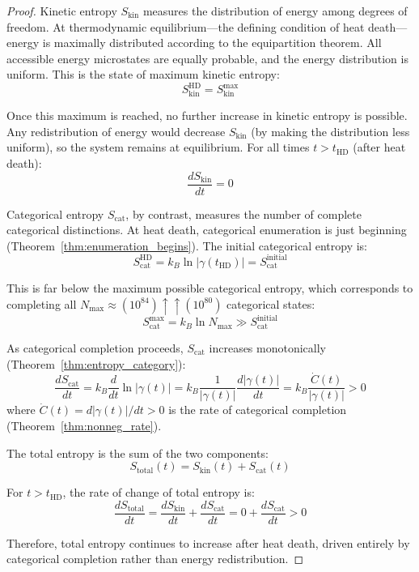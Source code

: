 \documentclass[12pt,a4paper]{article}
\theoremstyle{definition}
\theoremstyle{remark}
\newcommand{\Nmax}{N_{\text{max}}}
\begin{document}
\begin{proof}
Kinetic entropy $S_{\text{kin}}$ measures the distribution of energy among degrees of freedom. At thermodynamic equilibrium—the defining condition of heat death—energy is maximally distributed according to the equipartition theorem. All accessible energy microstates are equally probable, and the energy distribution is uniform. This is the state of maximum kinetic entropy:
\begin{equation}
S_{\text{kin}}^{\text{HD}} = S_{\text{kin}}^{\max}
\end{equation}

Once this maximum is reached, no further increase in kinetic entropy is possible. Any redistribution of energy would decrease $S_{\text{kin}}$ (by making the distribution less uniform), so the system remains at equilibrium. For all times $t > t_{\text{HD}}$ (after heat death):
\begin{equation}
\frac{dS_{\text{kin}}}{dt} = 0
\end{equation}

Categorical entropy $S_{\text{cat}}$, by contrast, measures the number of complete categorical distinctions. At heat death, categorical enumeration is just beginning (Theorem~\ref{thm:enumeration_begins}). The initial categorical entropy is:
\begin{equation}
S_{\text{cat}}^{\text{HD}} = k_B \ln |\gamma(t_{\text{HD}})| = S_{\text{cat}}^{\text{initial}}
\end{equation}

This is far below the maximum possible categorical entropy, which corresponds to completing all $\Nmax \approx (10^{84}) \uparrow\uparrow (10^{80})$ categorical states:
\begin{equation}
S_{\text{cat}}^{\max} = k_B \ln \Nmax \gg S_{\text{cat}}^{\text{initial}}
\end{equation}

As categorical completion proceeds, $S_{\text{cat}}$ increases monotonically (Theorem~\ref{thm:entropy_category}):
\begin{equation}
\frac{dS_{\text{cat}}}{dt} = k_B \frac{d}{dt} \ln |\gamma(t)| = k_B \frac{1}{|\gamma(t)|} \frac{d|\gamma(t)|}{dt} = k_B \frac{\dot{C}(t)}{|\gamma(t)|} > 0
\end{equation}
where $\dot{C}(t) = d|\gamma(t)|/dt > 0$ is the rate of categorical completion (Theorem~\ref{thm:nonneg_rate}).

The total entropy is the sum of the two components:
\begin{equation}
S_{\text{total}}(t) = S_{\text{kin}}(t) + S_{\text{cat}}(t)
\end{equation}

For $t > t_{\text{HD}}$, the rate of change of total entropy is:
\begin{equation}
\frac{dS_{\text{total}}}{dt} = \frac{dS_{\text{kin}}}{dt} + \frac{dS_{\text{cat}}}{dt} = 0 + \frac{dS_{\text{cat}}}{dt} > 0
\end{equation}

Therefore, total entropy continues to increase after heat death, driven entirely by categorical completion rather than energy redistribution.
\end{proof}
\end{document}
